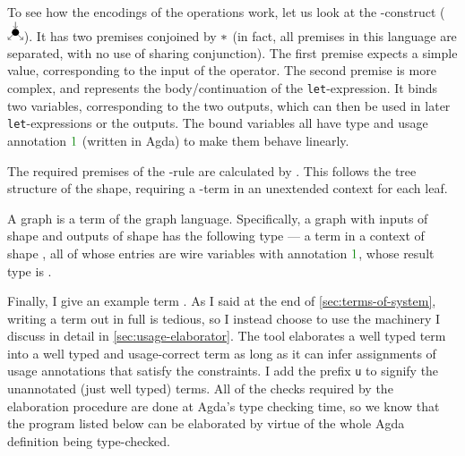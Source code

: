 To see how the encodings of the operations work, let us look at the
-construct
($\tikz{\node (n) [circle,fill,minimum size=2mm,inner sep=0] {};%
  \draw[->] (n) to (2.12mm,-2.12mm); \draw[->] (n) to (-2.12mm,-2.12mm);%
  \draw[->] (0,3mm) to (n)}$).
It has two premises conjoined by $\mathbin{*}$ (in fact, all premises in this language
are separated, with no use of sharing conjunction).
The first premise expects a simple value, corresponding to the input of the
operator.
The second premise is more complex, and represents the body/continuation of the
\texttt{let}-expression.
It binds two variables, corresponding to the two outputs, which can then be used
in later \texttt{let}-expressions or the outputs.
The bound variables all have type  and usage
annotation $\gr1$ (written  in Agda) to make them
behave linearly.


The required premises of the -rule are calculated
by .
This follows the tree structure of the shape, requiring a
-term in an unextended context for each leaf.


A graph is a term of the graph language.
Specifically, a graph with inputs of shape  and outputs of shape
 has the following type --- a term in a context of shape
, all of whose entries are wire variables with annotation $\gr1$,
whose result type is \AgdaSpace{}.


Finally, I give an example term .
As I said at the end of \cref{sec:terms-of-system}, writing a term out in full
is tedious, so I instead choose to use the machinery I discuss in detail in
\cref{sec:usage-elaborator}.
The  tool elaborates a well typed term into a well
typed and usage-correct term as long as it can infer assignments of usage
annotations that satisfy the constraints.
I add the prefix \texttt{u} to signify the unannotated (just well typed) terms.
All of the checks required by the elaboration procedure are done at Agda's type
checking time, so we know that the program listed below can be elaborated by
virtue of the whole Agda definition being type-checked.

